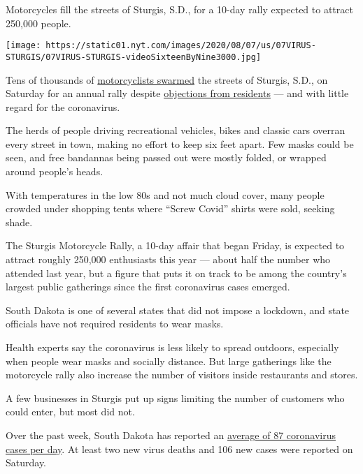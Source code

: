 Motorcycles fill the streets of Sturgis, S.D., for a 10-day rally
expected to attract 250,000 people.

\texttt{[image: https://static01.nyt.com/images/2020/08/07/us/07VIRUS-STURGIS/07VIRUS-STURGIS-videoSixteenByNine3000.jpg]}

Tens of thousands of
\href{https://www.nytimes.com/2020/08/07/us/sturgis-motorcyle-rally.html}{motorcyclists
swarmed} the streets of Sturgis, S.D., on Saturday for an annual rally
despite
\href{https://www.nytimes.com/2020/08/06/us/sturgis-motorcyle-rally-coronavirus.html}{objections
from residents} --- and with little regard for the coronavirus.

The herds of people driving recreational vehicles, bikes and classic
cars overran every street in town, making no effort to keep six feet
apart. Few masks could be seen, and free bandannas being passed out were
mostly folded, or wrapped around people's heads.

With temperatures in the low 80s and not much cloud cover, many people
crowded under shopping tents where ``Screw Covid'' shirts were sold,
seeking shade.

The Sturgis Motorcycle Rally, a 10-day affair that began Friday, is
expected to attract roughly 250,000 enthusiasts this year --- about half
the number who attended last year, but a figure that puts it on track to
be among the country's largest public gatherings since the first
coronavirus cases emerged.

South Dakota is one of several states that did not impose a lockdown,
and state officials have not required residents to wear masks.

Health experts say the coronavirus is less likely to spread outdoors,
especially when people wear masks and socially distance. But large
gatherings like the motorcycle rally also increase the number of
visitors inside restaurants and stores.

A few businesses in Sturgis put up signs limiting the number of
customers who could enter, but most did not.

Over the past week, South Dakota has reported an
\href{https://www.nytimes.com/interactive/2020/us/south-dakota-coronavirus-cases.html}{average
of 87 coronavirus cases per day}. At least two new virus deaths and 106
new cases were reported on Saturday.

\hypertarget{section-5}{%
\subsection{}\label{section-5}}

